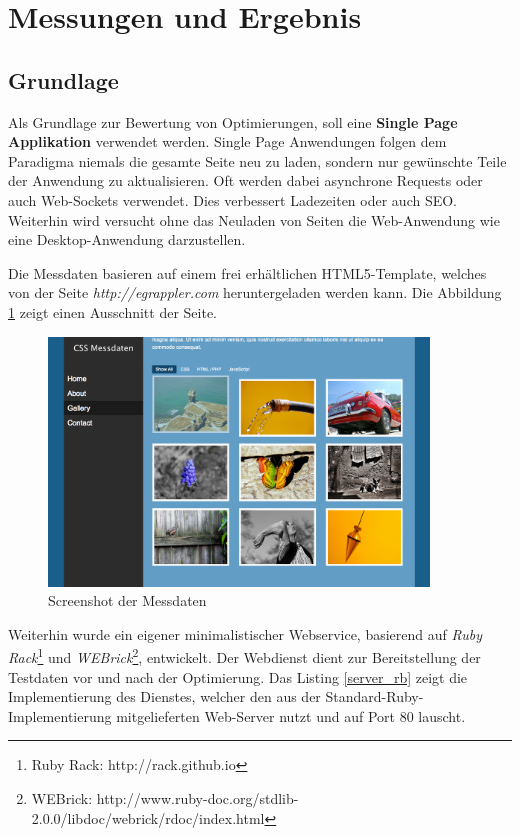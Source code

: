 \section{Messungen und Ergebnis}
\subsection{Grundlage}
Als Grundlage zur Bewertung von Optimierungen, soll eine \textbf{Single Page Applikation} verwendet werden. Single Page Anwendungen folgen dem Paradigma niemals die gesamte Seite neu zu laden, sondern nur gewünschte Teile der Anwendung zu aktualisieren. Oft werden dabei asynchrone Requests oder auch Web-Sockets verwendet. Dies verbessert Ladezeiten oder auch SEO. Weiterhin wird versucht ohne das Neuladen von Seiten die Web-Anwendung wie eine Desktop-Anwendung darzustellen.  

Die Messdaten basieren auf einem frei erhältlichen HTML5-Template, welches von der Seite \textit{http://egrappler.com} heruntergeladen werden kann. Die Abbildung \ref{messdaten-screenshot} zeigt einen Ausschnitt der Seite.

\begin{figure}[h!]
	\begin{center}
		\includegraphics[width=0.9\textwidth]{img/messdaten}
		\caption{Screenshot der Messdaten}
		\label{messdaten-screenshot}	
	\end{center}
\end{figure}

Weiterhin wurde ein eigener minimalistischer Webservice, basierend auf \textit{Ruby Rack}\footnote{Ruby Rack: http://rack.github.io} und \textit{WEBrick}\footnote{WEBrick: http://www.ruby-doc.org/stdlib-2.0.0/libdoc/webrick/rdoc/index.html}, entwickelt. Der Webdienst dient zur Bereitstellung der Testdaten vor und nach der Optimierung. Das Listing \ref{server_rb} zeigt die Implementierung des Dienstes, welcher den aus der Standard-Ruby-Implementierung mitgelieferten Web-Server nutzt und auf Port 80 lauscht. 

